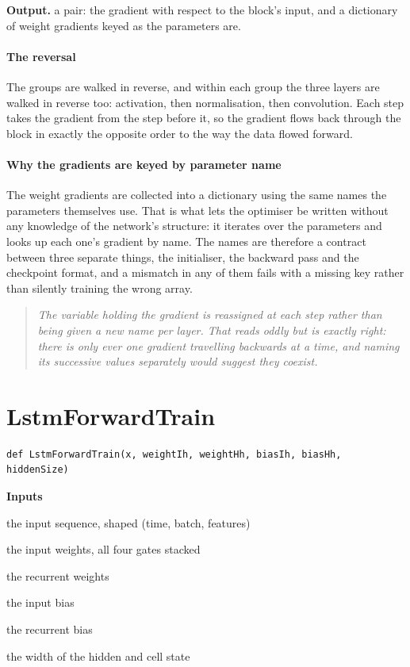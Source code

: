 \noindent\textbf{Output.} a pair: the gradient with respect to the block's input, and a dictionary of weight gradients keyed as the parameters are.


\paragraph{The reversal}
The groups are walked in reverse, and within each group the three layers are walked in reverse too: activation, then normalisation, then convolution. Each step takes the gradient from the step before it, so the gradient flows back through the block in exactly the opposite order to the way the data flowed forward.


\paragraph{Why the gradients are keyed by parameter name}
The weight gradients are collected into a dictionary using the same names the parameters themselves use. That is what lets the optimiser be written without any knowledge of the network's structure: it iterates over the parameters and looks up each one's gradient by name. The names are therefore a contract between three separate things, the initialiser, the backward pass and the checkpoint format, and a mismatch in any of them fails with a missing key rather than silently training the wrong array.


\begin{quote}\small\itshape The variable holding the gradient is reassigned at each step rather than being given a new name per layer. That reads oddly but is exactly right: there is only ever one gradient travelling backwards at a time, and naming its successive values separately would suggest they coexist.\end{quote}

\section{LstmForwardTrain}
\begin{lstlisting}[style=sig]
def LstmForwardTrain(x, weightIh, weightHh, biasIh, biasHh, hiddenSize)
\end{lstlisting}

\noindent\textbf{Inputs}
\begin{description}[leftmargin=2.2em,style=nextline,font=\normalfont\ttfamily]\setlength\itemsep{1pt}
  \item[{x}] \normalfont the input sequence, shaped (time, batch, features)
  \item[{weightIh}] \normalfont the input weights, all four gates stacked
  \item[{weightHh}] \normalfont the recurrent weights
  \item[{biasIh}] \normalfont the input bias
  \item[{biasHh}] \normalfont the recurrent bias
  \item[{hiddenSize}] \normalfont the width of the hidden and cell state
\end{description}

